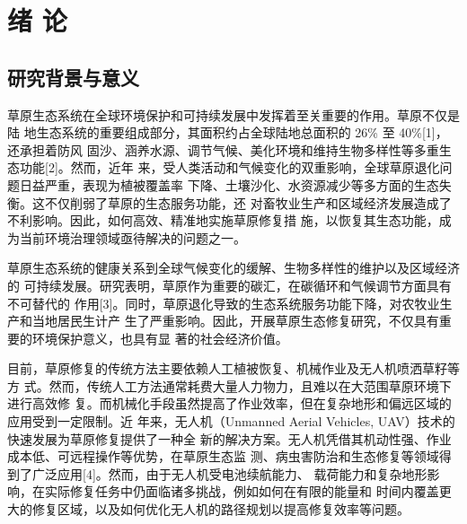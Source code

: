 \documentclass[AutoFakeBold]{LZUThesis}
\begin{document}
\mainmatter

\chapter{\texorpdfstring{绪 \quad 论}{绪论}}




\section{研究背景与意义}

草原生态系统在全球环境保护和可持续发展中发挥着至关重要的作用。草原不仅是陆
地生态系统的重要组成部分，其面积约占全球陆地总面积的 26\% 至 40\%[1]，还承担着防风
固沙、涵养水源、调节气候、美化环境和维持生物多样性等多重生态功能[2]。然而，近年
来，受人类活动和气候变化的双重影响，全球草原退化问题日益严重，表现为植被覆盖率
下降、土壤沙化、水资源减少等多方面的生态失衡。这不仅削弱了草原的生态服务功能，还
对畜牧业生产和区域经济发展造成了不利影响。因此，如何高效、精准地实施草原修复措
施，以恢复其生态功能，成为当前环境治理领域亟待解决的问题之一。

草原生态系统的健康关系到全球气候变化的缓解、生物多样性的维护以及区域经济的
可持续发展。研究表明，草原作为重要的碳汇，在碳循环和气候调节方面具有不可替代的
作用[3]。同时，草原退化导致的生态系统服务功能下降，对农牧业生产和当地居民生计产
生了严重影响。因此，开展草原生态修复研究，不仅具有重要的环境保护意义，也具有显
著的社会经济价值。

目前，草原修复的传统方法主要依赖人工植被恢复、机械作业及无人机喷洒草籽等方
式。然而，传统人工方法通常耗费大量人力物力，且难以在大范围草原环境下进行高效修
复。而机械化手段虽然提高了作业效率，但在复杂地形和偏远区域的应用受到一定限制。近
年来，无人机（Unmanned Aerial Vehicles, UAV）技术的快速发展为草原修复提供了一种全
新的解决方案。无人机凭借其机动性强、作业成本低、可远程操作等优势，在草原生态监
测、病虫害防治和生态修复等领域得到了广泛应用[4]。然而，由于无人机受电池续航能力、
载荷能力和复杂地形影响，在实际修复任务中仍面临诸多挑战，例如如何在有限的能量和
时间内覆盖更大的修复区域，以及如何优化无人机的路径规划以提高修复效率等问题。
\end{document}
